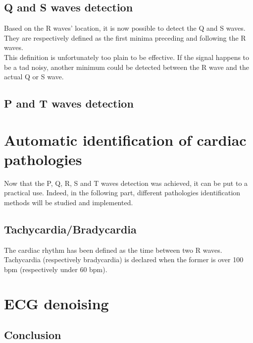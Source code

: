 \documentclass[11pt]{report}
\begin{document}
	\section{Q and S waves detection}
		Based on the R waves' location, it is now possible to detect the Q and S waves. They are respectively defined as the first minima preceding and following the R waves.\\
		This definition is unfortunately too plain to be effective. If the signal happens to be a tad noisy, another minimum could be detected between the R wave and the actual Q or S wave. 
	\section{P and T waves detection}



\chapter{Automatic identification of cardiac pathologies}
	Now that the P, Q, R, S and T waves detection was achieved, it can be put to a practical use. Indeed, in the following part, different pathologies identification methods will be studied and implemented.
	\section{Tachycardia/Bradycardia}
		The cardiac rhythm has been defined as the time between two R waves. Tachycardia (respectively bradycardia) is declared when the former is over 100 bpm (respectively under 60 bpm).\\
\chapter{ECG denoising}


\newpage
\section*{Conclusion}
\end{document}
